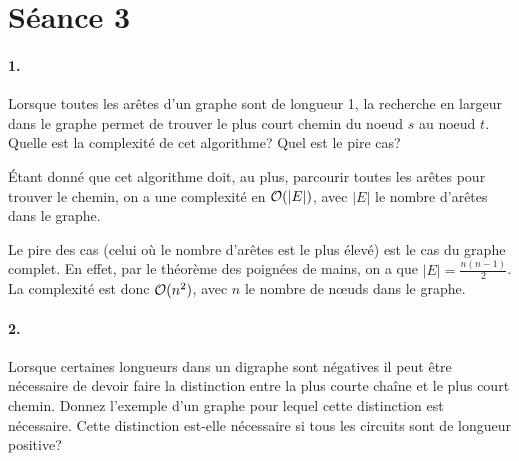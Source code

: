%
%

\section{Séance 3}


\paragraph{1. } Lorsque toutes les arêtes d'un graphe sont de longueur 1, la recherche en largeur dans le graphe permet de trouver le plus court chemin du noeud $s$ au noeud $t$. Quelle est la complexité de cet algorithme? Quel est le pire cas?

\begin{solution}
  Étant donné que cet algorithme doit, au plus, parcourir toutes les arêtes pour trouver le chemin,
  on a une complexité en $\mathcal{O}(\vert E \vert)$, avec $\vert E \vert$ le nombre d'arêtes dans le graphe.

  Le pire des cas (celui où le nombre d'arêtes est le plus élevé) est le cas du graphe complet.
  En effet, par le théorème des poignées de mains, on a que $\vert E \vert = \frac{n(n-1)}{2}$.
  La complexité est donc $\mathcal{O}(n^2)$, avec $n$ le nombre de nœuds dans le graphe.
\end{solution}

\paragraph{2. } Lorsque certaines longueurs dans un digraphe sont négatives il peut être nécessaire de devoir faire la distinction entre la plus courte chaîne et le plus court chemin. Donnez l'exemple d'un graphe pour lequel cette distinction est nécessaire. Cette distinction est-elle nécessaire si tous les circuits sont de longueur positive?


